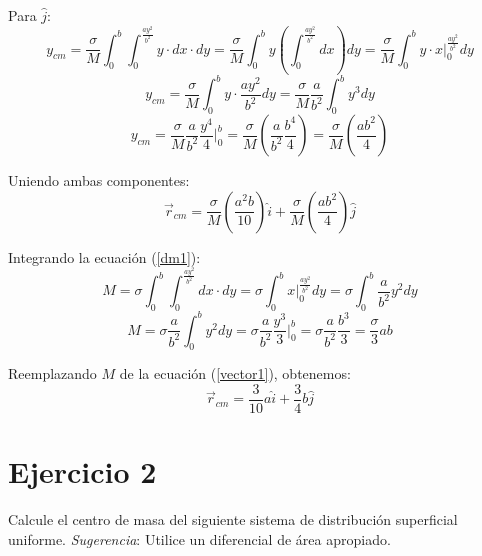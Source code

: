 \documentclass[letter,11pt]{article}
\begin{document}
Para $\hat{j}$:
\begin{equation*}
    y_{cm} = \frac{\sigma}{M} \int_{0}^{b} \int_{0}^{\frac{a y^2}{b^2}} y \cdot dx \cdot dy = \frac{\sigma}{M} \int_{0}^{b} y \left(\int_{0}^{\frac{a y^2}{b^2}} dx \right) dy = \frac{\sigma}{M} \int_{0}^{b} y \cdot x\Biggr|_{0}^{\frac{a y^2}{b^2}} dy
\end{equation*}
\begin{equation*}
    y_{cm} = \frac{\sigma}{M} \int_{0}^{b}  y \cdot \frac{a y^2}{b^2} dy = \frac{\sigma}{M} \frac{a}{b^2} \int_{0}^{b} y^3 dy
\end{equation*}
\begin{equation*}
    y_{cm} = \frac{\sigma}{M} \frac{a}{b^2} \frac{y^4}{4} \Biggr|_{0}^{b} = \frac{\sigma}{M} \left( \frac{a}{b^2} \frac{b^4}{4} \right) = \frac{\sigma}{M} \left( \frac{ab^2}{4} \right)
\end{equation*}

\vspace{0.5cm}
Uniendo ambas componentes:
\begin{equation}
    \vec{r}_{cm} = \frac{\sigma}{M} \left( \frac{a^2 b}{10} \right) \hat{i} + \frac{\sigma}{M} \left( \frac{a b^2}{4} \right) \hat{j}
\label{vector1}
\end{equation}

Integrando la ecuación (\ref{dm1}):
\begin{equation*}
    M = \sigma \int_{0}^{b} \int_{0}^{\frac{a y^2}{b^2}} dx \cdot dy = \sigma \int_{0}^{b} x\Biggr|_{0}^{\frac{a y^2}{b^2}} dy = \sigma \int_{0}^{b} \frac{a}{b^2} y^2 dy
\end{equation*}
\begin{equation*}
    M = \sigma \frac{a}{b^2} \int_{0}^{b} y^2 dy = \sigma \frac{a}{b^2} \frac{y^3}{3}\Biggr|_{0}^{b} = \sigma \frac{a}{b^2} \frac{b^3}{3} = \frac{\sigma}{3} a b
\end{equation*}

Reemplazando $M$ de la ecuación (\ref{vector1}), obtenemos:
\begin{equation*}
    \vec{r}_{cm} = \frac{3}{10} a \hat{i} + \frac{3}{4} b \hat{j}
\tag{resultado}
\end{equation*}

\section{Ejercicio 2}
Calcule el centro de masa del siguiente sistema de distribución superficial
uniforme. \emph{Sugerencia}: Utilice un diferencial de área apropiado.
\end{document}
